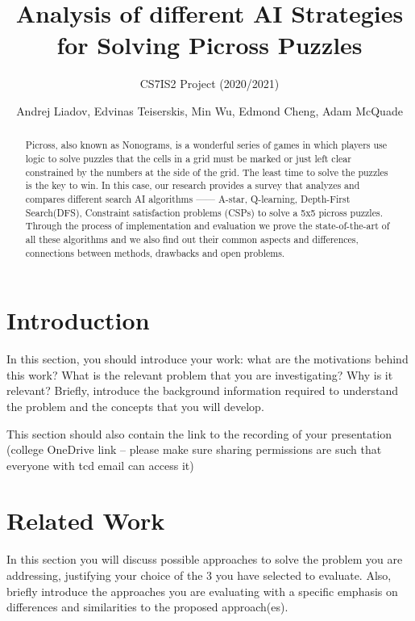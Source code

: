 \documentclass{svproc}
\begin{document}
	\mainmatter
	\title{Analysis of different AI Strategies for Solving Picross Puzzles
	}
	\subtitle{CS7IS2 Project (2020/2021)}
	\author{Andrej Liadov, Edvinas Teiserskis, Min Wu, Edmond Cheng, Adam McQuade}
	
	
	\maketitle              %
	
	\begin{abstract}
Picross, also known as Nonograms, is a wonderful series of games in which players use logic to solve puzzles that the cells in a grid must be marked or just left clear constrained by the numbers at the side of the grid. The least time to solve the puzzles is the key to win. In this case, our research provides a survey that analyzes and compares different search AI algorithms —— A-star, Q-learning, Depth-First Search(DFS), Constraint satisfaction problems (CSPs) to solve a 5x5 picross puzzles. Through the process of implementation and evaluation we prove the state-of-the-art of all these algorithms and we also find out their common aspects and differences, connections between methods, drawbacks and open problems. 
	\end{abstract}
	
	

	\section{Introduction}
	In this section, you should introduce your work: what are the motivations behind this work? What is the relevant problem that you are investigating? Why is it relevant?
	Briefly, introduce the background information required to understand the problem and the concepts that you will develop.
	
	This section should also contain the link to the recording of your presentation (college OneDrive link – please make sure sharing permissions are such that everyone with tcd email can access it)
	
	\section{Related Work}
	In this section you will discuss possible approaches to solve the problem you are addressing, justifying your choice of the 3 you have selected to evaluate. Also, briefly introduce the approaches you are evaluating with a specific emphasis on differences and similarities to the proposed approach(es).
	
\end{document}
